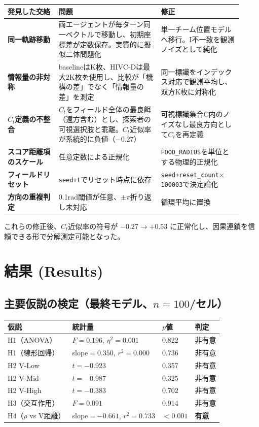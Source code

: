 \documentclass[11pt]{ltjsarticle}
\newcommand{\Ct}{\ensuremath{C_t}}
\begin{document}
\begin{longtable}{@{}p{0.20\linewidth} p{0.40\linewidth} p{0.32\linewidth}@{}}
\toprule
発見した交絡 & 問題 & 修正 \\
\midrule
\textbf{同一軌跡移動} & 両エージェントが毎ターン同一ベクトルで移動し、初期座標差が定数保存。実質的に擬似二体問題化 & 単一チーム位置モデルへ移行。I不一致を観測ノイズとして純化 \\
\textbf{情報量の非対称} & baselineはK枚、HIVC-Dは最大2K枚を使用し、比較が「機構の差」でなく「情報量の差」を測定 & 同一標識をインデックス対応で観測平均し、双方K枚に対称化 \\
\textbf{\Ct{}定義の不整合} & \Ct{}をフィールド全体の最良餌（遠方含む）とし、探索者の可視選択肢と乖離。\Ct{}近似率が系統的に負値（$-0.27$） & 可視標識集合C内のノイズなし最良方向として\Ct{}を再定義 \\
\textbf{スコア距離項のスケール} & 任意定数による正規化 & \texttt{FOOD\_RADIUS}を単位とする物理的正規化 \\
\textbf{フィールドリセット} & \texttt{seed+t}でリセット時点に依存 & \texttt{seed+reset\_count$\times$100003}で決定論化 \\
\textbf{方向の重複判定} & 0.1rad閾値が任意、$\pm\pi$折り返し未対応 & 循環平均に置換 \\
\bottomrule
\end{longtable}

これらの修正後、\Ct{}近似率の符号が \textbf{$-0.27 \to +0.53$} に正常化し、因果連鎖を信頼できる形で分解測定可能となった。

\section{結果 (Results)}

\subsection{主要仮説の検定（最終モデル、$n=100$/セル）}

\begin{longtable}{@{}l l l l@{}}
\toprule
仮説 & 統計量 & $p$値 & 判定 \\
\midrule
H1（ANOVA） & $F=0.196$, $\eta^2=0.001$ & 0.822 & 非有意 \\
H1（線形回帰） & slope$=0.350$, $r^2=0.000$ & 0.736 & 非有意 \\
H2 V-Low & $t=-0.923$ & 0.357 & 非有意 \\
H2 V-Mid & $t=-0.987$ & 0.325 & 非有意 \\
H2 V-High & $t=-0.383$ & 0.702 & 非有意 \\
H3（交互作用） & $F=0.091$ & 0.914 & 非有意 \\
H4（$\rho$ vs V距離） & slope$=-0.661$, $r^2=0.733$ & $<0.001$ & \textbf{有意} \\
\bottomrule
\end{longtable}
\end{document}
